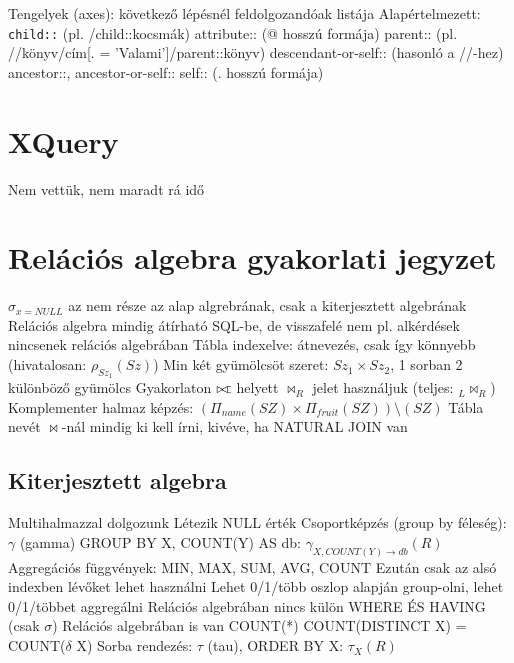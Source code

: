 \documentclass[12pt,a4paper]{article}
\def\ojoin{\setbox0=\hbox{$\bowtie$}%
  \rule[-.02ex]{.25em}{.4pt}\llap{\rule[\ht0]{.25em}{.4pt}}}
\def\rightouterjoin{\mathbin{\bowtie\mkern-5.8mu\ojoin}}
\begin{document}
\pagebreak

\begin{outline}
	\1 Tengelyek (axes): következő lépésnél feldolgozandóak listája
		\2 Alapértelmezett: \texttt{child::} (pl. /child::kocsmák)
		\2 attribute:: (@ hosszú formája)
		\2 parent:: (pl. //könyv/cím[. = 'Valami']/parent::könyv)
		\2 descendant-or-self:: (hasonló a //-hez)
		\2 ancestor::, ancestor-or-self::
		\2 self:: (. hosszú formája)
\end{outline}

\section{XQuery}

\begin{outline}
	\1 Nem vettük, nem maradt rá idő
\end{outline}

\pagebreak


\section{Relációs algebra gyakorlati jegyzet}

\begin{outline}
	\1 $\sigma_{x=NULL}$ az nem része az alap algrebrának, csak a kiterjesztett algebrának
	\1 Relációs algebra mindig átírható SQL-be, de visszafelé nem
		\2 pl. alkérdések nincsenek relációs algebrában
	\1 Tábla indexelve: átnevezés, csak így könnyebb (hivatalosan: $\rho_{Sz_1}(Sz)$)
	\1 Min két gyümölcsöt szeret: $Sz_1 \times Sz_2$, 1 sorban 2 különböző gyümölcs
	\1 Gyakorlaton $\rightouterjoin$ helyett $\bowtie_R$ jelet használjuk (teljes: $_L \bowtie_R$)
	\1 Komplementer halmaz képzés: $( \Pi_{name}(SZ) \times \Pi_{fruit} (SZ) ) \setminus (SZ)$
	\1 Tábla nevét $\bowtie$-nál mindig ki kell írni, kivéve, ha NATURAL JOIN van
\end{outline}

\subsection{Kiterjesztett algebra}

\begin{outline}
	\1 Multihalmazzal dolgozunk
	\1 Létezik NULL érték
	\1 Csoportképzés (group by féleség): $\gamma$ (gamma)
		\2 GROUP BY X, COUNT(Y) AS db: $\gamma_{X,COUNT(Y) \to db} (R)$
		\2 Aggregációs függvények: MIN, MAX, SUM, AVG, COUNT
		\2 Ezután csak az alsó indexben lévőket lehet használni
		\2 Lehet 0/1/több oszlop alapján group-olni, lehet 0/1/többet aggregálni
		\2 Relációs algebrában nincs külön WHERE ÉS HAVING (csak $\sigma$)
		\2 Relációs algebrában is van COUNT(*)
		\2 COUNT(DISTINCT X) = COUNT($\delta$ X)
	\1 Sorba rendezés: $\tau$ (tau), ORDER BY X: $\tau_{X} (R)$
\end{outline}
\end{document}
